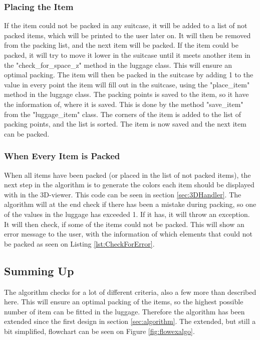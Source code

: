 \subsubsection{Placing the Item}
If the item could not be packed in any suitcase, it will be added to a list of not packed items, which will be printed to the user later on. It will then be removed from the packing list, and the next item will be packed. If the item could be packed, it will try to move it lower in the suitcase until it meets another item in the "check\_for\_space\_z" method in the luggage class. This will ensure an optimal packing. The item will then be packed in the suitcase by adding 1 to the value in every point the item will fill out in the suitcase, using the "place\_item" method in the luggage class. The packing points is saved to the item, so it have the information of, where it is saved. This is done by the method "save\_item" from the "luggage\_item" class. The corners of the item is added to the list of packing points, and the list is sorted. The item is now saved and the next item can be packed.
\subsubsection{When Every Item is Packed}
When all items have been packed (or placed in the list of not packed items), the next step in the algorithm is to generate the colors each item should be displayed with in the 3D-viewer. This code can be seen in section \ref{sec:3DHandler}.
The algorithm will at the end check if there has been a mistake during packing, so one of the values in the luggage has exceeded 1. If it has, it will throw an exception. It will then check, if some of the items could not be packed. This will show an error message to the user, with the information of which elements that could not be packed as seen on Listing \ref{lst:CheckForError}.

\subsection{Summing Up}
The algorithm checks for a lot of different criteria, also a few more than described here. This will ensure an optimal packing of the items, so the highest possible number of item can be fitted in the luggage. Therefore the algorithm has been extended since the first design in section \ref{sec:algorithm}. The extended, but still a bit simplified, flowchart can be seen on Figure \ref{fig:flowexalgo}.

